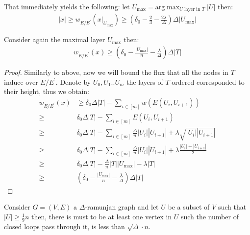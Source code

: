  That immediately yields the following: let $U_{\text{max}} = \text{arg} \max_{U \text{ layer in }  T } |U|  $  then: 
  \begin{equation*}
    \begin{split}
      |x| \ge  w_{E/E^{\prime}}\left( x|_{U_{\text{max}}} \right) \ge \left( \delta_{0} - \frac{2}{3} - \frac{2\lambda}{\Delta} \right)\Delta |U_{\text{max}}|
    \end{split}
  \end{equation*}
  \begin{claim}  \label{claim:flu2}Consider again the maximal layer $U_{\max}$ then: 
  \begin{equation*}
    \begin{split}
      w_{E/E^{\prime}}\left( x \right) \ge \left( \delta_{0} - \frac{|U_{\max}|}{n} - \frac{\lambda}{\Delta} \right) \Delta|T| 
    \end{split}
  \end{equation*}
\end{claim}

  \begin{proof} Similarly to above, now we will bound the flux that all the nodes in $T$ induce over $E/E^{\prime}$. Denote by $U_{0}, U_{1} .. U_{m}$ the layers of $T$ ordered corresponded to their height, thus we obtain: 
  \begin{equation*}
    \begin{split}
      w_{E/E^{\prime}}\left( x \right) & \ge \delta_{0}\Delta|T| - \sum_{i\in [m]}{ w \left( E\left( U_{i}, U_{i+1}  \right) \right)  } \\ 
      \ge & \delta_{0}\Delta|T|  - \sum_{i \in [m]}{ E\left( U_{i}, U_{i+1}  \right)  } \\ 
      \ge & \delta_{0}\Delta|T|  -  \sum_{i \in [m]}{ \frac{\Delta}{n}|U_{i}| |U_{i+1}| + \lambda \sqrt{ |U_{i}| |U_{i+1}|} }\\ 
      \ge & \delta_{0}\Delta|T|  -  \sum_{i \in [m]}{ \frac{\Delta}{n}|U_{i}| |U_{i+1}| + \lambda \frac{ |U_{i}|+ |U_{i+1}|}{2 } }\\ 
      \ge & \delta_{0}\Delta|T|  - \frac{\Delta}{n}|T||U_{\max}| -  \lambda |T| \\ 
      \ge & \left( \delta_{0} - \frac{|U_{\max}| }{n}-  \frac{\lambda}{\Delta} \right) \Delta|T| 
    \end{split}
  \end{equation*}
  \end{proof}

  \begin{claim}
    Consider $G = \left( V,E \right)$ a $\Delta$-ramunjan graph and let $U$ be a subset of $V$ such that $|U|\ge \frac{1}{9}n$ then, there is must to be at least one vertex in $U$ such the number of closed loops pass through it, is less than $ \sqrt{\Delta} \cdot n $. 
  \end{claim}


